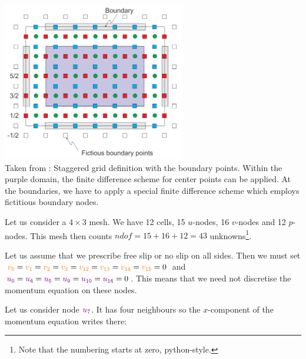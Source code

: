 \begin{center}
\includegraphics[width=8cm]{images/fdm/bk_A}\\
{\captionfont Taken from \textcite{beka}: Staggered grid definition with the boundary points. 
Within the purple domain, the
finite difference scheme for center points can be applied. At the boundaries, we have to apply a
special finite difference scheme which employs fictitious boundary nodes.}
\end{center}

Let us consider a $4\times 3$ mesh.
We have 12 cells, 15 {\color{violet}$u$}-nodes, 
16 {\color{orange}$v$}-nodes and 12 {\color{teal}$p$}-nodes.
This mesh then counts $ndof=15+16+12=43$ unknowns\footnote{
Note that the numbering starts at zero, python-style.}.



Let us assume that we prescribe free slip or no slip on all sides.
Then we must set 
${\color{orange}v_{\tt 0}}={\color{orange}v_{\tt 1}}={\color{orange}v_{\tt 2}}={\color{orange}v_{\tt 3}}={\color{orange}v_{\tt 12}}={\color{orange}v_{\tt 13}}={\color{orange}v_{\tt 14}}={\color{orange}v_{\tt 15}}=0$
and ${\color{violet} u_{\tt 0}}={\color{violet}u_{\tt 4}}={\color{violet}u_{\tt 5}}
={\color{violet}u_{\tt 9}}={\color{violet}u_{\tt 10}} = {\color{violet}u_{\tt 14}}=0$.
This means that we need not discretise the momentum equation on these nodes.

Let us consider node ${\color{violet} u_{7}}$. It has four neighbours so the $x$-component of 
the momentum equation writes there:

